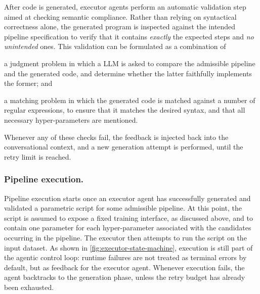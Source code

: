 \documentclass[runningheads]{llncs}
\newenvironment{inlinelist}{\begin{enumerate*}[label=\emph{(\roman*)}]}{\end{enumerate*}}
\begin{document}
After code is generated,
executor agents perform an automatic validation step aimed at checking semantic compliance.
%
Rather than relying on syntactical correctness alone,
the generated program is inspected against the intended pipeline specification
to verify that it contains \emph{exactly} the expected steps and \emph{no unintended} ones.
%
This validation can be formulated as a combination of
\begin{inlinelist}
  \item a judgment problem in which a \ac{LLM} is asked to compare
  the admissible pipeline and the generated code,
  and determine whether the latter faithfully implements the former\footnotemark;
  and
  \item a matching problem in which the generated code is matched against a number of regular expressions,
  to ensure that it matches the desired syntax,
  and that all necessary hyper-parameters are mentioned.
\end{inlinelist}
%
%
Whenever any of these checks fail,
the feedback is injected back into the conversational context,
and a new generation attempt is performed,
until the retry limit is reached.


\subsubsection{Pipeline execution.}

Pipeline execution starts once an executor agent has successfully generated
and validated a parametric script for some admissible pipeline.
%
At this point,
the script is assumed to expose a fixed training interface,
as discussed above,
and to contain one parameter for each hyper-parameter associated with the candidates occurring in the pipeline.
%
The executor then attempts to run the script on the input dataset.
%
As shown in \cref{fig:executor-state-machine},
execution is still part of the agentic control loop:
runtime failures are not treated as terminal errors by default,
but as feedback for the executor agent.
%
Whenever execution fails,
the agent backtracks to the generation phase,
unless the retry budget has already been exhausted.
%
\end{document}
